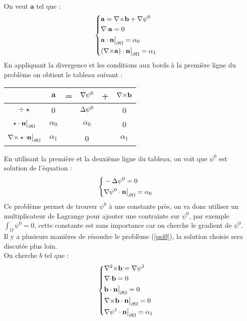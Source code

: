 On veut $\mathbf{a}$ tel que :
\begin{equation}\label{a}
\left\{\begin{aligned}
&\mathbf{a}={\nabla\times} \mathbf{b}+{\nabla}\psi^0\\
&{\nabla\cdot} \mathbf{a} =0\\
&\mathbf{a}\cdot \mathbf{n}{\big\rvert_{\partial\Omega}} = \alpha_0\\
&({\nabla\times} \mathbf{a})\cdot \mathbf{n}{\big\rvert_{\partial\Omega}} = \alpha_1
\end{aligned}\right.
\end{equation}
En appliquant la divergence et les conditions aux bords à la première ligne du problème on obtient le tableau suivant :
\begin{center}
\begin{tabular}{c|ccccc}
& $\mathbf{a}$ & = & ${\nabla}\psi^0$ & + & ${\nabla\times} \mathbf{b}$ \\ \hline
$\div\star$ & 0 & & ${\Delta}\psi^0$ & & 0\\ \hline
$\star\cdot \mathbf{n}{\big\rvert_{\partial\Omega}}$ & $\alpha_0$ & & $\alpha_0$ & & 0\\ \hline
${\nabla\times}\star\cdot \mathbf{n}{\big\rvert_{\partial\Omega}}$ & $\alpha_1$ & & 0 & & $\alpha_1$
\end{tabular}
\end{center}
En utilisant la première et la deuxième ligne du tableau, on voit que $\psi^0$ est solution de l'équation :
\begin{equation}\label{psi0}
\left\{\begin{aligned}
&-{\Delta}\psi^0 = 0\\
&{\nabla}\psi^0\cdot \mathbf{n}{\big\rvert_{\partial\Omega}}=\alpha_0
\end{aligned}\right.
\end{equation}
Ce problème permet de trouver $\psi^0$ à une constante près, on va donc utiliser un multiplicateur de Lagrange pour ajouter une contrainte sur $\psi^0$, par exemple $\int_\Omega \psi^0 = 0$, cette constante est sans importance car on cherche le gradient de $\psi^0$.\\
Il y a plusieurs manières de résoudre le problème (\ref{psi0}), la solution choisie sera discutée plus loin.\\

On cherche $b$ tel que :
\begin{equation}\label{curlb}
\left\{\begin{aligned}
&{\nabla^2\times} \mathbf{b} = {\nabla}\psi^1\\
&{\nabla\cdot} \mathbf{b} = 0\\
&\mathbf{b}\cdot \mathbf{n}{\big\rvert_{\partial\Omega}} = 0\\
&{\nabla\times} \mathbf{b}\cdot \mathbf{n}{\big\rvert_{\partial\Omega}} = 0\\
&{\nabla}\psi^1\cdot \mathbf{n}{\big\rvert_{\partial\Omega}} = \alpha_1
\end{aligned}\right.
\end{equation}

